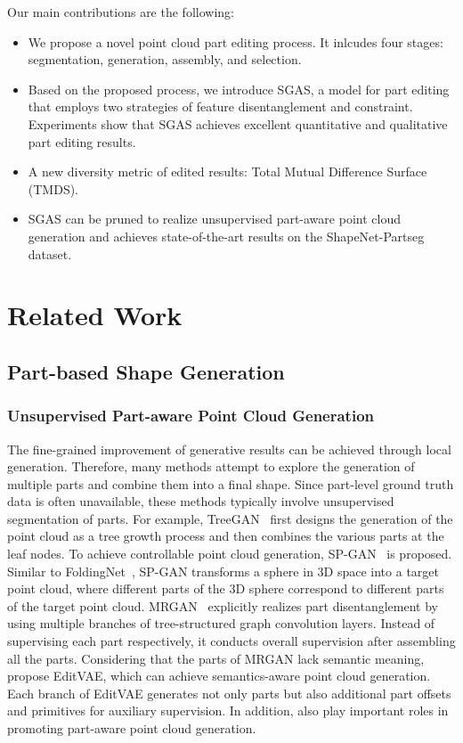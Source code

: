 \documentclass[letterpaper]{article} %
\begin{document}
Our main contributions are the following:
\begin{itemize}
    \item We propose a novel point cloud part editing process. It inlcudes four stages: segmentation, generation, assembly, and selection.
    \item Based on the proposed process, we introduce SGAS, a model for part editing that employs two strategies of feature disentanglement and constraint. Experiments show that SGAS achieves excellent quantitative and qualitative part editing results.
    \item A new diversity metric of edited results: Total Mutual Difference Surface (TMDS).
    \item SGAS can be pruned to realize unsupervised part-aware point cloud generation and achieves state-of-the-art results on the ShapeNet-Partseg dataset.
\end{itemize}


\section{Related Work}

\subsection{Part-based Shape Generation}

\subsubsection{Unsupervised Part-aware Point Cloud Generation}

The fine-grained improvement of generative results can be achieved through local generation. Therefore, many methods attempt to explore the generation of multiple parts and combine them into a final shape. Since part-level ground truth data is often unavailable, these methods typically involve unsupervised segmentation of parts. For example, TreeGAN~\citep{Shu_2019_ICCV} first designs the generation of the point cloud as a tree growth process and then combines the various parts at the leaf nodes. To achieve controllable point cloud generation, SP-GAN~\citep{li2021spgan} is proposed. Similar to FoldingNet~\citep{Yang_2018_CVPR}, SP-GAN transforms a sphere in 3D space into a target point cloud, where different parts of the 3D sphere correspond to different parts of the target point cloud. MRGAN~\citep{Gal_2021_ICCV} explicitly realizes part disentanglement by using multiple branches of tree-structured graph convolution layers. Instead of supervising each part respectively, it conducts overall supervision after assembling all the parts. Considering that the parts of MRGAN lack semantic meaning, \citet{Li_Liu_Walder_2022} propose EditVAE, which can achieve semantics-aware point cloud generation. Each branch of EditVAE generates not only parts but also additional part offsets and primitives for auxiliary supervision. In addition, \citep{ngn2020LPMNetLP,Postels_2021_3DV,Li_2022_TVCG,cheng2022autoregressive} also play important roles in promoting part-aware point cloud generation.
\end{document}
